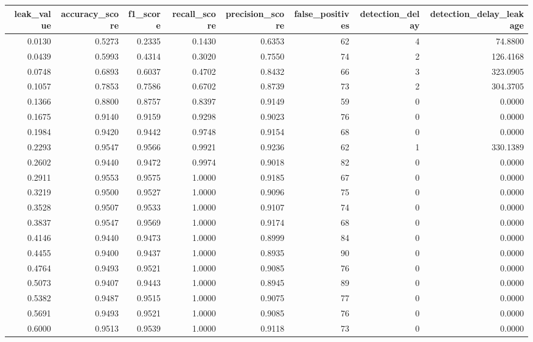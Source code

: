 \begin{tabular}{rrrrrrrr}
\toprule
leak\_value & accuracy\_score & f1\_score & recall\_score & precision\_score & false\_positives & detection\_delay & detection\_delay\_leakage \\
\midrule
0.0130 & 0.5273 & 0.2335 & 0.1430 & 0.6353 & 62 & 4 & 74.8800 \\
0.0439 & 0.5993 & 0.4314 & 0.3020 & 0.7550 & 74 & 2 & 126.4168 \\
0.0748 & 0.6893 & 0.6037 & 0.4702 & 0.8432 & 66 & 3 & 323.0905 \\
0.1057 & 0.7853 & 0.7586 & 0.6702 & 0.8739 & 73 & 2 & 304.3705 \\
0.1366 & 0.8800 & 0.8757 & 0.8397 & 0.9149 & 59 & 0 & 0.0000 \\
0.1675 & 0.9140 & 0.9159 & 0.9298 & 0.9023 & 76 & 0 & 0.0000 \\
0.1984 & 0.9420 & 0.9442 & 0.9748 & 0.9154 & 68 & 0 & 0.0000 \\
0.2293 & 0.9547 & 0.9566 & 0.9921 & 0.9236 & 62 & 1 & 330.1389 \\
0.2602 & 0.9440 & 0.9472 & 0.9974 & 0.9018 & 82 & 0 & 0.0000 \\
0.2911 & 0.9553 & 0.9575 & 1.0000 & 0.9185 & 67 & 0 & 0.0000 \\
0.3219 & 0.9500 & 0.9527 & 1.0000 & 0.9096 & 75 & 0 & 0.0000 \\
0.3528 & 0.9507 & 0.9533 & 1.0000 & 0.9107 & 74 & 0 & 0.0000 \\
0.3837 & 0.9547 & 0.9569 & 1.0000 & 0.9174 & 68 & 0 & 0.0000 \\
0.4146 & 0.9440 & 0.9473 & 1.0000 & 0.8999 & 84 & 0 & 0.0000 \\
0.4455 & 0.9400 & 0.9437 & 1.0000 & 0.8935 & 90 & 0 & 0.0000 \\
0.4764 & 0.9493 & 0.9521 & 1.0000 & 0.9085 & 76 & 0 & 0.0000 \\
0.5073 & 0.9407 & 0.9443 & 1.0000 & 0.8945 & 89 & 0 & 0.0000 \\
0.5382 & 0.9487 & 0.9515 & 1.0000 & 0.9075 & 77 & 0 & 0.0000 \\
0.5691 & 0.9493 & 0.9521 & 1.0000 & 0.9085 & 76 & 0 & 0.0000 \\
0.6000 & 0.9513 & 0.9539 & 1.0000 & 0.9118 & 73 & 0 & 0.0000 \\
\bottomrule
\end{tabular}
